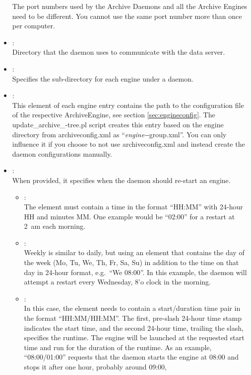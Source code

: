 \begin{itemize}
      \NOTE The port numbers used by the Archive Daemons and all the Archive
      Engines need to be different. You cannot use the same port number more
      than once per computer.
\item {}:\\
      Directory that the daemon uses to communicate with the data server.
\item {}:\\
      Specifies the sub-directory for each engine under a daemon.
\item {}:\\
      This element of each engine entry contains the path to the
      configuration file of the respective ArchiveEngine, see section
      \ref{sec:engineconfig}. The update\_archive\_-tree.pl script
      creates this entry based on the engine directory from
      archiveconfig.xml as ``{\it engine-}-group.xml''. You can only
      influence it if you choose to not use archiveconfig.xml and
      instead create the daemon configurations manually.
\item {}:\\
      When provided, it specifies when the daemon should re-start an engine.
      \begin{itemize}
      \item {}:\\
         The element must contain a time in the
	 format ``HH:MM'' with 24-hour HH and minutes MM. One example
	 would be ``02:00'' for a restart at 2~am each morning.
      \item {}:\\
	 Weekly is similar to daily, but using an element that contains the day
	 of the week (Mo, Tu,  We, Th, Fr, Sa, Su) in addition to the time
	 on that day in 24-hour format, e.g.\ ``We 08:00''. In this example,
	 the daemon will attempt a restart every Wednesday,
         8'o clock in the morning.
      \item {}:\\
	 In this case, the element needs to contain a start/duration time pair
	 in the format ``HH:MM/HH:MM''. The first, pre-slash 24-hour time stamp
	 indicates the start time, and the second 24-hour time, trailing the
	 slash, specifies the runtime. The engine will be launched at the
	 requested start time and run for the duration of the runtime. As an
	 example, ``08:00/01:00'' requests that the daemon starts the engine at
	 08:00 and stops it after one hour, probably around 09:00,

\end{itemize}
\end{itemize}
